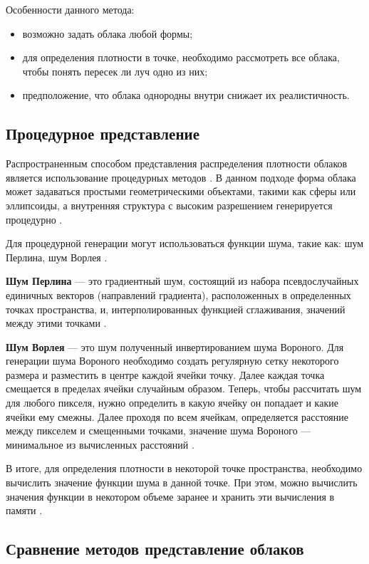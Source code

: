 Особенности данного метода:
\begin{itemize}
	\item возможно задать облака любой формы;
	\item для определения плотности в точке, необходимо рассмотреть все облака, чтобы понять пересек ли луч одно из них;
	\item предположение, что облака однородны внутри снижает их реалистичность. 
\end{itemize}

\subsection{Процедурное представление} 
\label{implicit}
Распространенным способом представления распределения плотности облаков является использование процедурных методов \cite{frostbite, hzd}. В данном подходе форма облака может задаваться простыми геометрическими объектами, такими как сферы или эллипсоиды, а внутренняя структура с высоким разрешением генерируется процедурно \cite{clouds}. 

Для процедурной генерации могут использоваться функции шума, такие как: шум Перлина, шум Ворлея \cite{frostbite, hzd}. 

\textbf{Шум Перлина} --- это градиентный шум, состоящий из набора псевдослучайных единичных векторов (направлений градиента), расположенных в определенных точках пространства, и, интерполированных функцией сглаживания, значений между этими точками \cite{perlin}.

\textbf{Шум Ворлея} --- это шум полученный инвертированием шума Вороного. Для генерации шума Вороного необходимо создать регулярную сетку некоторого размера и разместить в центре каждой ячейки точку. Далее каждая точка смещается в пределах ячейки случайным образом. Теперь, чтобы рассчитать шум для любого пикселя, нужно определить в какую ячейку он попадает и какие ячейки ему смежны. Далее проходя по всем ячейкам, определяется расстояние между пикселем и смещенными точками, значение шума Вороного --- минимальное из вычисленных расстояний \cite{worley}. 


В итоге, для определения плотности в некоторой точке пространства, необходимо вычислить значение функции шума в данной точке. При этом, можно вычислить значения функции в некотором объеме заранее и хранить эти вычисления в памяти \cite{implicit, hzd, frostbite, clouds}.

\subsection{Сравнение методов представление облаков}

